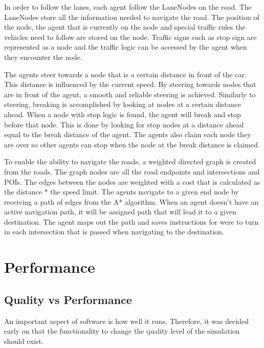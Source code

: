     In order to follow the lanes, each agent follow the LaneNodes on the road. The LaneNodes store all the information needed to navigate the road. The position of the node, the agent that is currently on the node and special traffic rules the vehicles need to follow are stored on the node. Traffic signs such as stop sign are represented as a node and the traffic logic can be accessed by the agent when they encounter the node. 

    The agents steer towards a node that is a certain distance in front of the car. This distance is influenced by the current speed. By steering towards nodes that are in front of the agent, a smooth and reliable steering is achieved. Similarly to steering, breaking is accomplished by looking at nodes at a certain distance ahead. When a node with stop logic is found, the agent will break and stop before that node. This is done by looking for stop nodes at a distance ahead equal to the break distance of the agent. The agents also claim each node they are over so other agents can stop when the node at the break distance is claimed.                                          

    To enable the ability to navigate the roads, a weighted directed graph is created from the roads. The graph nodes are all the road endpoints and intersections and POIs. The edges between the nodes are weighted with a cost that is calculated as the distance * the speed limit. The agents navigate to a given end node by receiving a path of edges from the A* algorithm. When an agent doesn't have an active navigation path, it will be assigned path that will lead it to a given destination. The agent maps out the path and saves instructions for were to turn in each intersection that is passed when navigating to the destination.

\section{Performance}

\subsection{Quality vs Performance}
    An important aspect of software is how well it runs. Therefore, it was decided early on that the functionality to change the quality level of the simulation should exist. 

